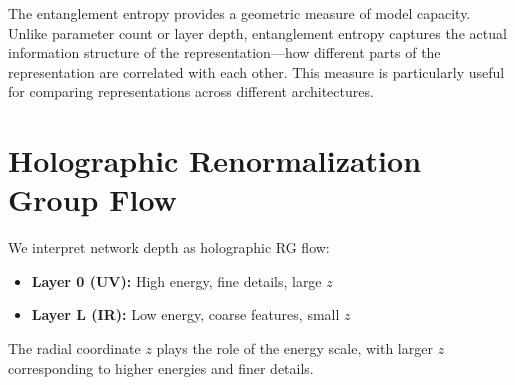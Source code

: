 \documentclass[12pt,a4paper]{article}
\begin{document}
The entanglement entropy provides a geometric measure of model capacity. Unlike parameter count or layer depth, entanglement entropy captures the actual information structure of the representation—how different parts of the representation are correlated with each other. This measure is particularly useful for comparing representations across different architectures.

\section{Holographic Renormalization Group Flow}

We interpret network depth as holographic RG flow:

\begin{itemize}[leftmargin=1.5cm]
\item \textbf{Layer 0 (UV):} High energy, fine details, large $z$
\item \textbf{Layer L (IR):} Low energy, coarse features, small $z$
\end{itemize}

The radial coordinate $z$ plays the role of the energy scale, with larger $z$ corresponding to higher energies and finer details.
\end{document}
